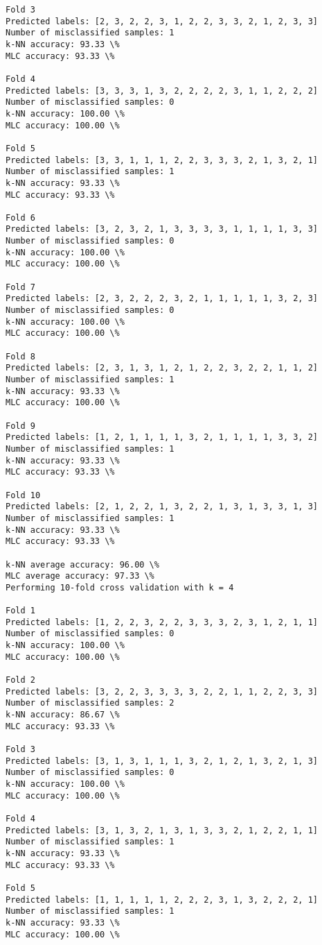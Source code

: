 \documentclass[11pt]{article}
\begin{document}
\begin{Verbatim}[commandchars=\\\{\}]
Fold 3
Predicted labels: [2, 3, 2, 2, 3, 1, 2, 2, 3, 3, 2, 1, 2, 3, 3]
Number of misclassified samples: 1
k-NN accuracy: 93.33 \%
MLC accuracy: 93.33 \%

Fold 4
Predicted labels: [3, 3, 3, 1, 3, 2, 2, 2, 2, 3, 1, 1, 2, 2, 2]
Number of misclassified samples: 0
k-NN accuracy: 100.00 \%
MLC accuracy: 100.00 \%

Fold 5
Predicted labels: [3, 3, 1, 1, 1, 2, 2, 3, 3, 3, 2, 1, 3, 2, 1]
Number of misclassified samples: 1
k-NN accuracy: 93.33 \%
MLC accuracy: 93.33 \%

Fold 6
Predicted labels: [3, 2, 3, 2, 1, 3, 3, 3, 3, 1, 1, 1, 1, 3, 3]
Number of misclassified samples: 0
k-NN accuracy: 100.00 \%
MLC accuracy: 100.00 \%

Fold 7
Predicted labels: [2, 3, 2, 2, 2, 3, 2, 1, 1, 1, 1, 1, 3, 2, 3]
Number of misclassified samples: 0
k-NN accuracy: 100.00 \%
MLC accuracy: 100.00 \%

Fold 8
Predicted labels: [2, 3, 1, 3, 1, 2, 1, 2, 2, 3, 2, 2, 1, 1, 2]
Number of misclassified samples: 1
k-NN accuracy: 93.33 \%
MLC accuracy: 100.00 \%

Fold 9
Predicted labels: [1, 2, 1, 1, 1, 1, 3, 2, 1, 1, 1, 1, 3, 3, 2]
Number of misclassified samples: 1
k-NN accuracy: 93.33 \%
MLC accuracy: 93.33 \%

Fold 10
Predicted labels: [2, 1, 2, 2, 1, 3, 2, 2, 1, 3, 1, 3, 3, 1, 3]
Number of misclassified samples: 1
k-NN accuracy: 93.33 \%
MLC accuracy: 93.33 \%

k-NN average accuracy: 96.00 \%
MLC average accuracy: 97.33 \%
Performing 10-fold cross validation with k = 4

Fold 1
Predicted labels: [1, 2, 2, 3, 2, 2, 3, 3, 3, 2, 3, 1, 2, 1, 1]
Number of misclassified samples: 0
k-NN accuracy: 100.00 \%
MLC accuracy: 100.00 \%

Fold 2
Predicted labels: [3, 2, 2, 3, 3, 3, 3, 2, 2, 1, 1, 2, 2, 3, 3]
Number of misclassified samples: 2
k-NN accuracy: 86.67 \%
MLC accuracy: 93.33 \%

Fold 3
Predicted labels: [3, 1, 3, 1, 1, 1, 3, 2, 1, 2, 1, 3, 2, 1, 3]
Number of misclassified samples: 0
k-NN accuracy: 100.00 \%
MLC accuracy: 100.00 \%

Fold 4
Predicted labels: [3, 1, 3, 2, 1, 3, 1, 3, 3, 2, 1, 2, 2, 1, 1]
Number of misclassified samples: 1
k-NN accuracy: 93.33 \%
MLC accuracy: 93.33 \%

Fold 5
Predicted labels: [1, 1, 1, 1, 1, 2, 2, 2, 3, 1, 3, 2, 2, 2, 1]
Number of misclassified samples: 1
k-NN accuracy: 93.33 \%
MLC accuracy: 100.00 \%


\end{Verbatim}
\end{document}
